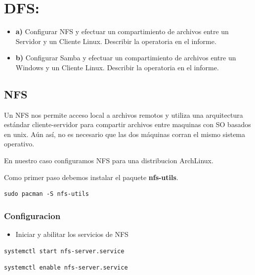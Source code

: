 \documentclass[12pt]{extarticle}
\providecommand{\tightlist}{%
      \setlength{\itemsep}{0pt}\setlength{\parskip}{0pt}}
\begin{document}
    

    \section{DFS:}\label{dfs}

\begin{itemize}
\item
  \textbf{a)} Configurar NFS y efectuar un compartimiento de archivos
  entre un Servidor y un Cliente Linux. Describir la operatoria en el
  informe.
\item
  \textbf{b)} Configurar Samba y efectuar un compartimiento de archivos
  entre un Windows y un Cliente Linux. Describir la operatoria en el
  informe.
\end{itemize}

    \subsection{NFS}\label{nfs}

Un NFS nos permite acceso local a archivos remotos y utiliza una
arquitectura estándar cliente-servidor para compartir archivos entre
maquinas con SO basados en unix. Aún así, no es necesario que las dos
máquinas corran el mismo sistema operativo.

En nuestro caso configuramos NFS para una distribucion ArchLinux.

Como primer paso debemos instalar el paquete \textbf{nfs-utils}.

\begin{verbatim}
sudo pacman -S nfs-utils
\end{verbatim}

\subsubsection{Configuracion}\label{configuracion}

\begin{itemize}
\tightlist
\item
  Iniciar y abilitar los servicios de NFS
\end{itemize}

\begin{verbatim}
systemctl start nfs-server.service
\end{verbatim}

\begin{verbatim}
systemctl enable nfs-server.service
\end{verbatim}
\end{document}
